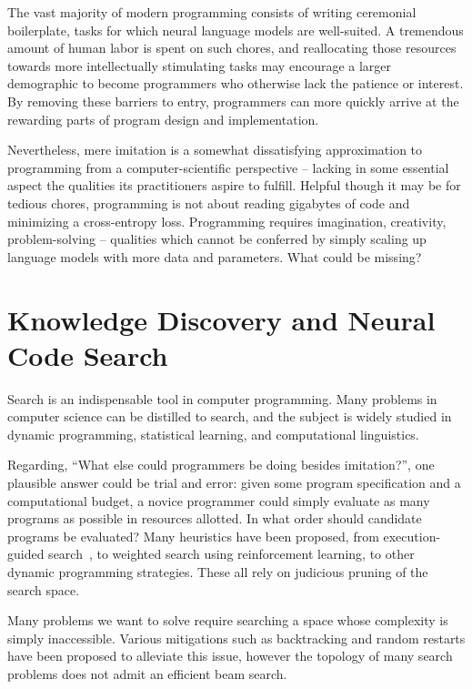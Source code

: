 \documentclass[10pt]{article}
\begin{document}
The vast majority of modern programming consists of writing ceremonial boilerplate, tasks for which neural language models are well-suited. A tremendous amount of human labor is spent on such chores, and reallocating those resources towards more intellectually stimulating tasks may encourage a larger demographic to become programmers who otherwise lack the patience or interest. By removing these barriers to entry, programmers can more quickly arrive at the rewarding parts of program design and implementation.

Nevertheless, mere imitation is a somewhat dissatisfying approximation to programming from a computer-scientific perspective -- lacking in some essential aspect the qualities its practitioners aspire to fulfill. Helpful though it may be for tedious chores, programming is not about reading gigabytes of code and minimizing a cross-entropy loss. Programming requires imagination, creativity, problem-solving -- qualities which cannot be conferred by simply scaling up language models with more data and parameters. What could be missing?

  \section{Knowledge Discovery and Neural Code Search}

Search is an indispensable tool in computer programming. Many problems in computer science can be distilled to search, and the subject is widely studied in dynamic programming, statistical learning, and computational linguistics.

Regarding, ``What else could programmers be doing besides imitation?'', one plausible answer could be trial and error: given some program specification and a computational budget, a novice programmer could simply evaluate as many programs as possible in resources allotted. In what order should candidate programs be evaluated? Many heuristics have been proposed, from execution-guided search~\cite{chen2018execution, wang2018execution}, to weighted search using reinforcement learning, to other dynamic programming strategies. These all rely on judicious pruning of the search space.

Many problems we want to solve require searching a space whose complexity is simply inaccessible. Various mitigations such as backtracking and random restarts have been proposed to alleviate this issue, however the topology of many search problems does not admit an efficient beam search.
\end{document}
